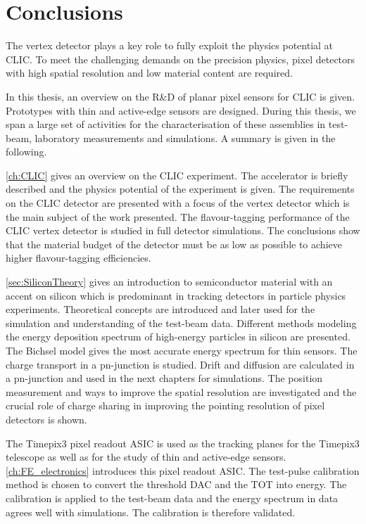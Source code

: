 \chapter{Conclusions}
\label{ch:conclusions}


The vertex detector plays a key role to fully exploit the physics
potential at CLIC. To meet the challenging demands on the precision
physics, pixel detectors with high spatial resolution and low material
content are required.

In this thesis, an overview on the R\&D of planar pixel sensors for
CLIC is given. Prototypes with thin and active-edge sensors are
designed. During this thesis, we span a large set of activities for
the characterisation of these assemblies in test-beam, laboratory
measurements and simulations. A summary is given in the following.

\cref{ch:CLIC} gives an overview on the CLIC experiment. The
accelerator is briefly described and the physics potential of the
experiment is given. The requirements on the CLIC detector are
presented with a focus of the vertex detector which is the main
subject of the work presented. The flavour-tagging performance of the
CLIC vertex detector is studied in full detector simulations. The
conclusions show that the material budget of the detector must be as
low as possible to achieve higher flavour-tagging efficiencies.

\cref{sec:SiliconTheory} gives an introduction to semiconductor
material with an accent on silicon which is predominant in tracking
detectors in particle physics experiments. Theoretical concepts are
introduced and later used for the simulation and understanding of the
test-beam data. Different methods modeling the energy deposition
spectrum of high-energy particles in silicon are presented. The
Bichsel model gives the most accurate energy spectrum for thin
sensors. The charge transport in a pn-junction is studied. Drift and
diffusion are calculated in a pn-junction and used in the next
chapters for simulations. The position measurement and ways to improve
the spatial resolution are investigated and the crucial role of charge
sharing in improving the pointing resolution of pixel detectors is
shown.

The Timepix3 pixel readout ASIC is used as the tracking planes for the
Timepix3 telescope as well as for the study of thin and active-edge
sensors. \cref{ch:FE_electronics} introduces this pixel readout
ASIC. The test-pulse calibration method is chosen to convert the
threshold DAC and the TOT into energy. The calibration is applied to
the test-beam data and the energy spectrum in data agrees well with
simulations. The calibration is therefore validated.

